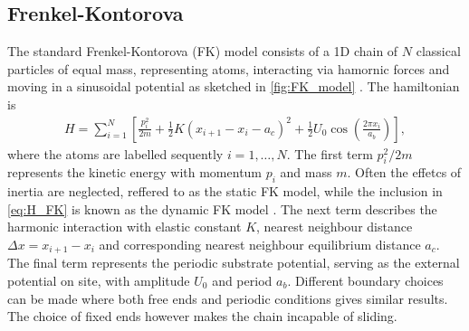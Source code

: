 







\subsection{Frenkel-Kontorova}

The standard Frenkel-Kontorova (\acrshort{FK}) model consists of a 1D chain of $N$ classical
particles of equal mass, representing atoms, interacting via hamornic forces and moving in a sinusoidal potential as sketched in \cref{fig:FK_model} \cite{Manini_2016}. The hamiltonian is 
\begin{align}
  H = \sum_{i=1}^N \left[\frac{p_i^2}{2m} + \frac{1}{2}K(x_{i+1} - x_i - a_c)^2 + \frac{1}{2}U_0 \cos{\left(\frac{2\pi x_i}{a_b}\right)}\right],
  \label{eq:H_FK}
\end{align}
where the atoms are labelled sequently $i = 1, \hdots, N$. The first term $p_i^2/2m$ represents the kinetic energy with momentum $p_i$
and mass $m$. Often the effetcs of inertia are neglected, reffered to as the static \acrshort{FK} model, while the inclusion in \cref{eq:H_FK} is known as the dynamic \acrshort{FK} model \cite{FK2D}. The next term describes the harmonic interaction with elastic
constant $K$, nearest neighbour distance $\Delta x = x_{i+1} - x_i$ and 
corresponding nearest neighbour equilibrium distance $a_c$. The final term represents the periodic substrate potential, serving as the external potential on site, with amplitude $U_0$ and period $a_b$. Different boundary choices can be made where both free ends and periodic conditions gives similar results. The choice of fixed ends however makes the chain incapable of sliding.

